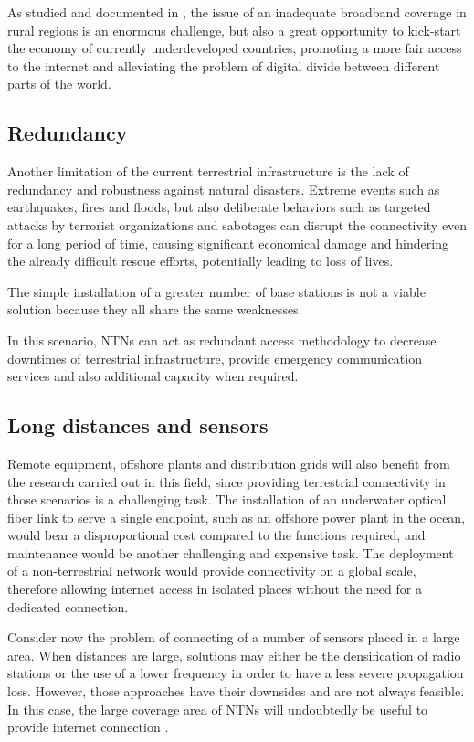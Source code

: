 As studied and documented in \cite{6g-challenge-opportunity-base-pyramid}, the issue of an inadequate broadband coverage in rural regions is an enormous challenge, but also a great opportunity to kick-start the economy of currently underdeveloped countries, promoting a more fair access to the internet and alleviating the problem of digital divide between different parts of the world.

\subsection{Redundancy}
Another limitation of the current terrestrial infrastructure is the lack of redundancy and robustness against natural disasters. Extreme events such as earthquakes, fires and floods, but also deliberate behaviors such as targeted attacks by terrorist organizations and sabotages can disrupt the connectivity even for a long period of time, causing significant economical damage and hindering the already difficult rescue efforts, potentially leading to loss of lives.

The simple installation of a greater number of base stations is not a viable solution because they all share the same weaknesses.

In this scenario, \ac{NTNs} can act as redundant access methodology to decrease downtimes of terrestrial infrastructure, provide emergency communication services and also additional capacity when required. 

\subsection{Long distances and sensors}
Remote equipment, offshore plants and distribution grids will also benefit from the research carried out in this field, since providing terrestrial connectivity in those scenarios is a challenging task. The installation of an underwater optical fiber link to serve a single endpoint, such as an offshore power plant in the ocean, would bear a disproportional cost compared to the functions required, and maintenance would be another challenging and expensive task. 
The deployment of a non-terrestrial network would provide connectivity on a global scale, therefore allowing internet access in isolated places without the need for a dedicated connection.

Consider now the problem of connecting of a number of sensors placed in a large area. When distances are large, solutions may either be the densification of radio stations or the use of a lower frequency in order to have a less severe propagation loss. However, those approaches have their downsides and are not always feasible. In this case, the large coverage area of \ac{NTNs} will undoubtedly be useful to provide internet connection \cite{performance-ntn-support-iot-wang}.

